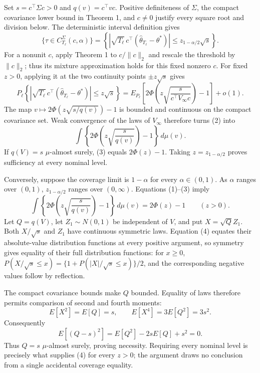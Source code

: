 Set \(s=c^\top\Sigma c>0\) and \(q(v)=c^\top vc\). Positive definiteness of \(\Sigma\), the compact covariance lower bound in Theorem 1, and \(c\ne0\) justify every square root and division below. The deterministic interval definition gives
\[
 \{\tau\in C_{T_\ell}^{\Sigma}(c,\alpha)\}
 =\left\{\left|\sqrt{T_\ell}\,c^\top(\widehat\theta_{T_\ell}-\theta^*)\right|
 \le z_{1-\alpha/2}\sqrt s\right\}. \tag{1}
\]
For a nonunit \(c\), apply Theorem 1 to \(c/\|c\|_2\) and rescale the threshold by \(\|c\|_2\); thus its mixture approximation holds for this fixed nonzero \(c\). For fixed \(z>0\), applying it at the two continuity points \(\pm z\sqrt s\) gives
\[
 P_\ell\left\{\left|\sqrt{T_\ell}\,c^\top(\widehat\theta_{T_\ell}-\theta^*)\right|
 \le z\sqrt s\right\}
 =E_{P_\ell}\left[2\Phi\left(z\sqrt{\frac{s}{c^\top V_\infty c}}\right)-1\right]+o(1). \tag{2}
\]
The map \(v\mapsto2\Phi(z\sqrt{s/q(v)})-1\) is bounded and continuous on the compact covariance set. Weak convergence of the laws of \(V_\infty\) therefore turns (2) into
\[
 \int\left\{2\Phi\left(z\sqrt{\frac{s}{q(v)}}\right)-1\right\}\,d\mu(v). \tag{3}
\]
If \(q(V)=s\) \(\mu\)-almost surely, (3) equals \(2\Phi(z)-1\). Taking \(z=z_{1-\alpha/2}\) proves sufficiency at every nominal level.

Conversely, suppose the coverage limit is \(1-\alpha\) for every \(\alpha\in(0,1)\). As \(\alpha\) ranges over \((0,1)\), \(z_{1-\alpha/2}\) ranges over \((0,\infty)\). Equations (1)--(3) imply
\[
 \int\left\{2\Phi\left(z\sqrt{\frac{s}{q(v)}}\right)-1\right\}\,d\mu(v)
 =2\Phi(z)-1\qquad(z>0). \tag{4}
\]
Let \(Q=q(V)\), let \(Z_1\sim N(0,1)\) be independent of \(V\), and put \(X=\sqrt QZ_1\). Both \(X/\sqrt s\) and \(Z_1\) have continuous symmetric laws. Equation (4) equates their absolute-value distribution functions at every positive argument, so symmetry gives equality of their full distribution functions: for \(x\ge0\), \(P(X/\sqrt s\le x)=\{1+P(|X|/\sqrt s\le x)\}/2\), and the corresponding negative values follow by reflection.

The compact covariance bounds make \(Q\) bounded. Equality of laws therefore permits comparison of second and fourth moments:
\[
 E[X^2]=E[Q]=s,
 \qquad E[X^4]=3E[Q^2]=3s^2. \tag{5}
\]
Consequently
\[
 E[(Q-s)^2]=E[Q^2]-2sE[Q]+s^2=0. \tag{6}
\]
Thus \(Q=s\) \(\mu\)-almost surely, proving necessity. Requiring every nominal level is precisely what supplies (4) for every \(z>0\); the argument draws no conclusion from a single accidental coverage equality.